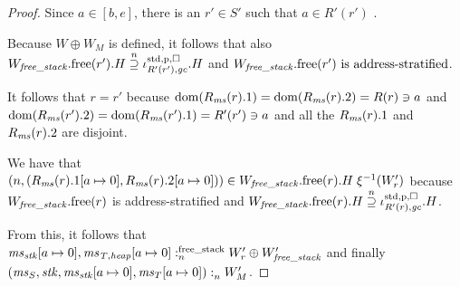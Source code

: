 \begin{proof}
  Since $a \in [b,e]$, there is an $r' \in S'$ such that $a \in R'(r')$ .

  Because $W \oplus W_M$ is defined, it follows that also
  $\pwfree[W_\var{free\_stack}](r').H \nsupeq \stdreg{R'(r'),\gc}{\pur}.H$ and
  $\pwfree[W_\var{free\_stack}](r') \text{ is address-stratified}$.

  It follows that $r = r'$ because $\dom(R_\ms(r).1) = \dom(R_\ms(r).2) = R(r) \ni a$ and $ \dom(R_\ms(r').2) = \dom(R_\ms(r').1) = R'(r') \ni a$ and all the $R_\ms(r).1$ and $R_\ms(r).2$ are disjoint.

  We have that $\npair{(R_\ms(r).1\update{a}{0},R_\ms(r).2\update{a}{0})} \in \pwfree[W_\var{free\_stack}](r).H \; \xi^{-1}(W_r')$ because $\pwfree[W_\var{free\_stack}](r)$ is address-stratified and $\pwfree[W_\var{free\_stack}](r).H \nsupeq \stdreg{R'(r),\gc}{\pur}.H$.

  From this, it follows that $\memSatFStack{\ms_\stk\update{a}{0},\ms_\var{T,heap}\update{a}{0}}{W_r' \oplus W_\var{free\_stack}'}$ and finally $\memSat{(\ms_S,\stk,\ms_\stk\update{a}{0},\ms_T\update{a}{0})}{W_M'}$.
\end{proof}

